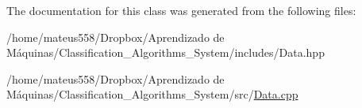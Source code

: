 The documentation for this class was generated from the following files\+:\begin{DoxyCompactItemize}
\item 
/home/mateus558/\+Dropbox/\+Aprendizado de Máquinas/\+Classification\+\_\+\+Algorithms\+\_\+\+System/includes/Data.\+hpp\item 
/home/mateus558/\+Dropbox/\+Aprendizado de Máquinas/\+Classification\+\_\+\+Algorithms\+\_\+\+System/src/\hyperlink{_data_8cpp}{Data.\+cpp}\end{DoxyCompactItemize}
